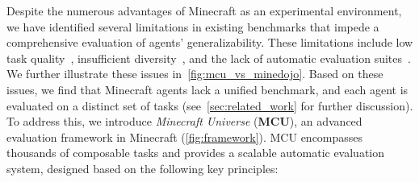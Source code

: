 Despite the numerous advantages of Minecraft as an experimental environment, we have identified several limitations in existing benchmarks that impede a comprehensive evaluation of agents' generalizability. These limitations include low task quality~\citep{minedojo}, insufficient diversity~\citep{crafter}, and the lack of automatic evaluation suites~\citep{groot}. We further illustrate these issues in~\cref{fig:mcu_vs_minedojo}. Based on these issues, we find that Minecraft agents lack a unified benchmark, and each agent is evaluated on a distinct set of tasks (see~\cref{sec:related_work} for further discussion). To address this, we introduce \emph{Minecraft Universe} (\textbf{MCU}), an advanced evaluation framework in Minecraft (\cref{fig:framework}). MCU encompasses thousands of composable tasks and provides a scalable automatic evaluation system, designed based on the following key principles:
